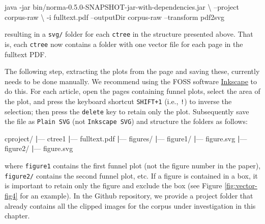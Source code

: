 \documentclass[a5paper]{book}
\newenvironment{Shaded}{\begin{snugshade}}{\end{snugshade}}
\newcommand{\KeywordTok}[1]{\textcolor[rgb]{0.13,0.29,0.53}{\textbf{#1}}}
\newcommand{\ExtensionTok}[1]{#1}
\newcommand{\NormalTok}[1]{#1}
\begin{document}
\begin{Shaded}
\begin{Highlighting}[]
\ExtensionTok{java}\NormalTok{ -jar bin/norma-0.5.0-SNAPSHOT-jar-with-dependencies.jar \textbackslash{}}
\NormalTok{  --project corpus-raw \textbackslash{}}
\NormalTok{  -i fulltext.pdf --outputDir corpus-raw --transform pdf2svg}
\end{Highlighting}
\end{Shaded}

resulting in a \texttt{svg/} folder for each \texttt{ctree} in the
structure presented above. That is, each \texttt{ctree} now contains a
folder with one vector file for each page in the fulltext PDF.

The following step, extracting the plots from the page and saving these,
currently needs to be done manually. We recommend using the FOSS
software \href{https://inkscape.org/}{Inkscape} to do this. For each
article, open the pages containing funnel plots, select the area of the
plot, and press the keyboard shortcut \texttt{SHIFT+1} (i.e.,
\texttt{!}) to inverse the selection; then press the \texttt{delete} key
to retain only the plot. Subsequently save the file as
\texttt{Plain\ SVG} (not \texttt{Inkscape\ SVG}) and structure the
folders as follows:

\begin{Shaded}
\begin{Highlighting}[]
\ExtensionTok{cproject/}
\KeywordTok{|}\ExtensionTok{---}\NormalTok{ ctree1}
    \KeywordTok{|}\ExtensionTok{---}\NormalTok{ fulltext.pdf}
    \KeywordTok{|}\ExtensionTok{---}\NormalTok{ figures/}
        \KeywordTok{|}\ExtensionTok{---}\NormalTok{ figure1/}
            \KeywordTok{|}\ExtensionTok{---}\NormalTok{ figure.svg}
        \KeywordTok{|}\ExtensionTok{---}\NormalTok{ figure2/}
            \KeywordTok{|}\ExtensionTok{---}\NormalTok{ figure.svg}
\end{Highlighting}
\end{Shaded}

where \texttt{figure1} contains the first funnel plot (not the figure
number in the paper), \texttt{figure2/} contains the second funnel plot,
etc. If a figure is contained in a box, it is important to retain only
the figure and exclude the box (see Figure \ref{fig:vector-fig4} for an
example). In the Github repository, we provide a project folder that
already contains all the clipped images for the corpus under
investigation in this chapter.
\end{document}

